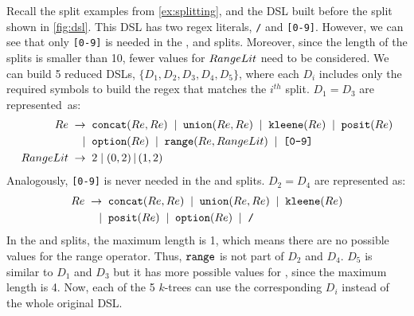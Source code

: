 \begin{example}
Recall the split examples from \autoref{ex:splitting}, and the DSL built before the split shown in \autoref{fig:dsl}. This DSL has two regex literals, \texttt{/} and \texttt{[0-9]}. However, we can see that only \texttt{[0-9]} is needed in the ,  and  splits. Moreover, since the length of the splits is smaller than 10, fewer values for \(RangeLit\) need to be considered.
We can build 5 reduced DSLs, \(\{D_1, D_2, D_3, D_4, D_5\}\), where each \(D_i\) includes only the required symbols to build the regex that matches the \(i^{th}\) split. \(D_1 = D_3\) are represented~as:
\begin{align*}
Re \;\to \;\; &\Concat(Re, Re) \;\;|\;\;  \Union(Re, Re)   \;\;|\;\;  \Kleene(Re) \;\;|\;\; \Posit(Re)\\
     |\;\;    &\Option(Re) \;\;|\;\;  \Range(Re, \Rangelit) \;\;|\;\; \texttt{[0-9]}\\
%
\Rangelit \;\to \;\;& 2 \;|\; (0,2) \,|\, (1,2)
\end{align*}
%
Analogously, \texttt{[0-9]} is never needed in the  and  splits. \(D_2 = D_4\) are represented as:
%
\begin{align*}
Re \;\to \;\; &\texttt{concat}(Re, Re) \;\;|\;\;  \texttt{union}(Re, Re)   \;\;|\;\;  \texttt{kleene}(Re) \\
        |\;\; &\texttt{posit}(Re) \;\;|\;\; \texttt{option}(Re) \;\;|\;\; \texttt{/}
\end{align*}
In the  and  splits, the maximum length is 1, which means there are no possible values for the range operator. Thus, \(\texttt{range}\) is not part of \(D_2\) and \(D_4\).
\(D_5\) is similar to \(D_1\) and \(D_3\) but it has more possible values for \Range{}, since the maximum length is 4.
Now, each of the 5 \(k\)-trees can use the corresponding \(D_i\) instead of the whole original DSL.
\end{example}

